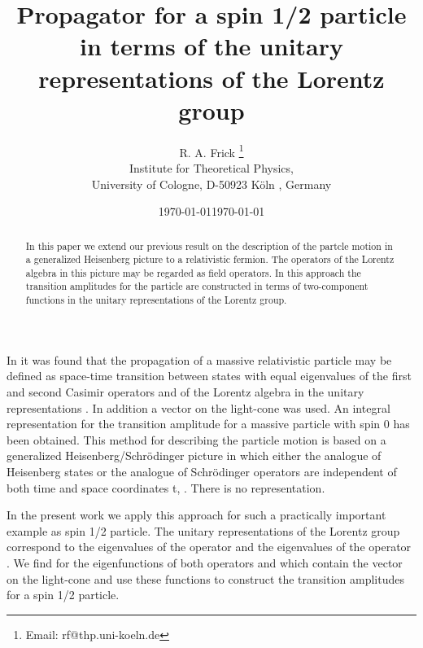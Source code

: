 \documentclass[a4paper,12pt]{article}
\begin{document}

\title {Propagator for a  spin 1/2 particle in terms of  the unitary representations of the Lorentz group}  
\date{\today}
\author{R. A. Frick  \thanks{Email: rf@thp.uni-koeln.de}\\{Institute for Theoretical Physics,}\\{ University of Cologne, D-50923 K\"oln , Germany}}
\date{\today}
\maketitle
\begin{abstract}
In this paper we extend our previous result on the description of the
partcle motion in a generalized Heisenberg picture to a relativistic
fermion.  The operators of the Lorentz algebra in this picture may be
regarded as field operators. In this approach the transition
amplitudes for the particle are constructed in terms of two-component
functions in the unitary representations of the Lorentz group.
\end{abstract}

 In \cite{Frick1} it was found that the propagation  of a massive relativistic particle  may be defined as  space-time transition between states with equal eigenvalues of the first  and  second Casimir operators \coordHE{} and \coordHE{} of the Lorentz algebra  in the unitary representations . In addition a vector on the light-cone \coordHE{}  \coordHE{} was used. An integral representation for  the transition amplitude for a massive particle with spin 0 has been obtained.
This  method for describing  the particle motion is based on a  generalized Heisenberg/Schr\"odinger  picture in which either the analogue of Heisenberg states or the analogue of Schr\"odinger operators are independent of both time and space coordinates t, \coordHE{} \cite{Frick2}. There is no \coordHE{} representation.

In the present work  we   apply   this approach for such a practically important example as spin 1/2 particle. The unitary  representations of the Lorentz group correspond to the eigenvalues \coordHE{}  of the operator \coordHE{}  and the eigenvalues \myHighlight{$\alpha\lambda$}\coordHE{} of the operator \coordHE{}  \coordHE{} \cite{Joos}. We find for \coordHE{} the eigenfunctions of both operators \coordHE{} and \coordHE{} which contain the vector on the light-cone \coordHE{} and use these functions to construct  the transition amplitudes for a spin 1/2 particle.  
\end{document}
